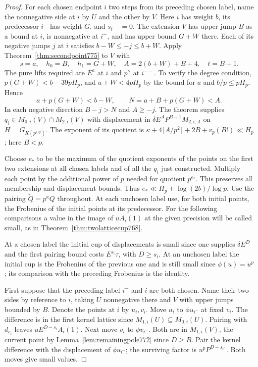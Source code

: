 \documentclass[a4paper,11pt]{article}
\theoremstyle{definition}
\theoremstyle{remark}
\numberwithin{equation}{section}
\begin{document}
\begin{proof}
For each chosen endpoint \(i\) two steps from its
preceding chosen label, name the nonnegative side at
\(i\) by \(U\) and the other by \(V\). Here \(i\) has
weight \(b\), its predecessor \(i^-\) has weight \(G\),
and \(s_{i^{--}}=0\). The extension \(V\) has upper
jump \(B\) as a bound at \(i\), is nonnegative at
\(i^-\), and has upper bound \(G+W\) there. Each of
its negative jumps \(j\) at \(i\) satisfies
\(b-W\le-j\le b+W\). Apply
Theorem~\ref{thm:secondpoint775} to \(V\) with
\[
 s=a,\quad h_0=B,\quad h_1=G+W,\quad
 A=2(b+W)+B+4,\quad t=B+1 .
\]
The pure lifts required are \(E^a\) at \(i\) and
\(p^\kappa\) at \(i^{--}\). To verify the degree condition,
\(p(G+W)<b-39pH_p\), and \(a+W< 4pH_p\) by the bound
for \(a\) and \(b/p\le pH_p\). Hence
\[
             a+p(G+W)< b-W,\qquad
 N=a+B+p(G+W)<A.
\]
In each negative direction \(B-j>N\) and \(A\ge-j\).
The theorem supplies \(q_i\in M_{0,i}(V)\cap M_{2,i}(V)\)
with displacement in \(\delta E^A P^{B+1}M_{2,i,A}\)
on \(H=G_{K(p^{1/p})}\). The exponent of its quotient
is \(\kappa+4\lceil A/p^2\rceil+2B+v_p(B!)\ll H_p\);
here \(B<p\).

Choose \(e_*\) to be the maximum of the quotient
exponents of the points on the first two extensions at
all chosen labels and of all the \(q_i\) just constructed.
Multiply each point by the additional power of \(p\)
needed for quotient \(p^{e_*}\). This preserves all
membership and displacement bounds. Thus
\(e_*\ll H_p+\log(2b)/\log p\). Use the pairing
\(\widetilde Q=p^\kappa Q\) throughout. At each unchosen
label use, for both initial points, the Frobenius of the
initial points at its predecessor. For the following
comparisons a value in the image of \(uA_i(1)\) at the
given precision will be called small, as in
Theorem~\ref{thm:twolatticecup768}.

At a chosen label the initial cup of displacements is
small since one supplies \(\delta E^D\) and the first
pairing bound costs \(E^{s_i}\tau\), with \(D\ge s_i\).
At an unchosen label the initial cup is the Frobenius
of the previous one and is still small since
\(\phi(u)=u^p\); its comparison with the preceding
Frobenius is the identity.

First suppose that the preceding label \(i^-\) and \(i\)
are both chosen. Name their two sides by reference to
\(i\), taking \(U\) nonnegative there and \(V\) with
upper jumps bounded by \(B\). Denote the points at
\(i\) by \(u_i,v_i\). Move \(u_i\) to \(\phi u_{i^-}\)
at fixed \(v_i\). The difference is in the first kernel
lattice since \(M_{1,i}(U)\subseteq M_{0,i}(U)\).
Pairing with \(d_{v_i}\) leaves \(uE^{D-s_i}A_i(1)\).
Next move \(v_i\) to \(\phi v_{i^-}\). Both are in
\(M_{1,i}(V)\), the current point by
Lemma~\ref{lem:remainingpole772} since \(D\ge B\).
Pair the kernel difference with the displacement of
\(\phi u_{i^-}\); the surviving factor is
\(u^p P^{D-s_{i^-}}\). Both moves give small values.


\end{proof}
\end{document}
